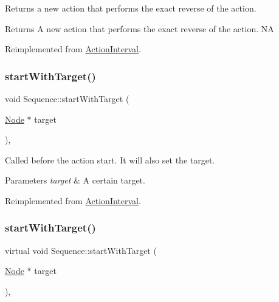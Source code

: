 Returns a new action that performs the exact reverse of the action.

\begin{DoxyReturn}{Returns}
A new action that performs the exact reverse of the action.  NA 
\end{DoxyReturn}


Reimplemented from \hyperlink{classActionInterval_a9f9ac7164036a0bc261a72f62a2b2da7}{Action\+Interval}.

\mbox{\label{classSequence_a8da6e287023489db0c5abe888b905697}} 
\subsubsection{\texorpdfstring{start\+With\+Target()}{startWithTarget()}\hspace{0.1cm}{\footnotesize\ttfamily [1/2]}}
{\footnotesize\ttfamily void Sequence\+::start\+With\+Target (\begin{DoxyParamCaption}\item[{\hyperlink{classNode}{Node} $\ast$}]{target }\end{DoxyParamCaption})\hspace{0.3cm}{\ttfamily [override]}, {\ttfamily [virtual]}}

Called before the action start. It will also set the target.


\begin{DoxyParams}{Parameters}
{\em target} & A certain target. \\
\hline
\end{DoxyParams}


Reimplemented from \hyperlink{classActionInterval_ad3d91186b2c3108488ddbbdbbd982484}{Action\+Interval}.

\mbox{\label{classSequence_a4d17fdbc7a236a63798e23ae12971b77}} 
\subsubsection{\texorpdfstring{start\+With\+Target()}{startWithTarget()}\hspace{0.1cm}{\footnotesize\ttfamily [2/2]}}
{\footnotesize\ttfamily virtual void Sequence\+::start\+With\+Target (\begin{DoxyParamCaption}\item[{\hyperlink{classNode}{Node} $\ast$}]{target }\end{DoxyParamCaption})\hspace{0.3cm}{\ttfamily [override]}, {\ttfamily [virtual]}}

